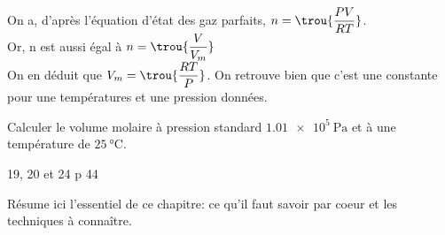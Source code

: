 On a, d'après l'équation d'état des gaz parfaits, $n=\trou{\dfrac{PV}{RT}}$.\\
Or, n est aussi égal à $n=\trou{\dfrac{V}{V_m}}$\\
On en déduit que $V_m=\trou{\dfrac{RT}{P}}$. On retrouve bien que c'est une constante pour une températures et une pression données.


Calculer le volume molaire à pression standard $\SI{1,01e5}{\pascal}$ et à une température de $\SI{25}{\celsius}$.
\vspace{3cm}

 19, 20 et 24 p 44

 Résume ici l'essentiel de ce chapitre: ce qu'il faut savoir par coeur et les techniques à connaître.



